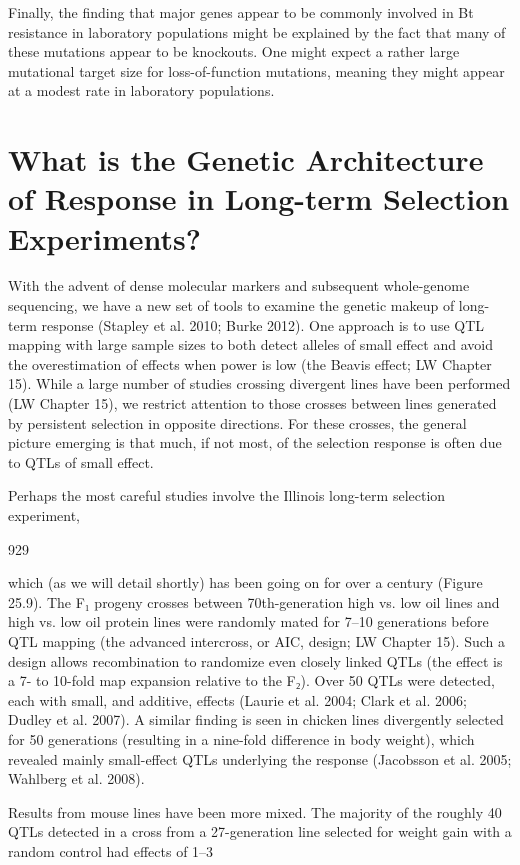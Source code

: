 \documentclass{article}
\begin{document}
Finally, the finding that major genes appear to be commonly involved in Bt resistance in laboratory populations might be explained by the fact that many of these mutations appear to be knockouts. One might expect a rather large mutational target size for loss-of-function mutations, meaning they might appear at a modest rate in laboratory populations.

\section{What is the Genetic Architecture of Response in Long-term Selection Experiments?}
With the advent of dense molecular markers and subsequent whole-genome sequencing, we have a new set of tools to examine the genetic makeup of long-term response (Stapley et al. 2010; Burke 2012). One approach is to use QTL mapping with large sample sizes to both detect alleles of small effect and avoid the overestimation of effects when power is low (the Beavis effect; LW Chapter 15). While a large number of studies crossing divergent lines have been performed (LW Chapter 15), we restrict attention to those crosses between lines generated by persistent selection in opposite directions. For these crosses, the general picture emerging is that much, if not most, of the selection response is often due to QTLs of small effect.

Perhaps the most careful studies involve the Illinois long-term selection experiment,

929

which (as we will detail shortly) has been going on for over a century (Figure 25.9). The F₁ progeny crosses between 70th-generation high vs. low oil lines and high vs. low oil protein lines were randomly mated for 7–10 generations before QTL mapping (the advanced intercross, or AIC, design; LW Chapter 15). Such a design allows recombination to randomize even closely linked QTLs (the effect is a 7- to 10-fold map expansion relative to the F₂). Over 50 QTLs were detected, each with small, and additive, effects (Laurie et al. 2004; Clark et al. 2006; Dudley et al. 2007). A similar finding is seen in chicken lines divergently selected for 50 generations (resulting in a nine-fold difference in body weight), which revealed mainly small-effect QTLs underlying the response (Jacobsson et al. 2005; Wahlberg et al. 2008).

Results from mouse lines have been more mixed. The majority of the roughly 40 QTLs detected in a cross from a 27-generation line selected for weight gain with a random control had effects of 1–3%
\end{document}
